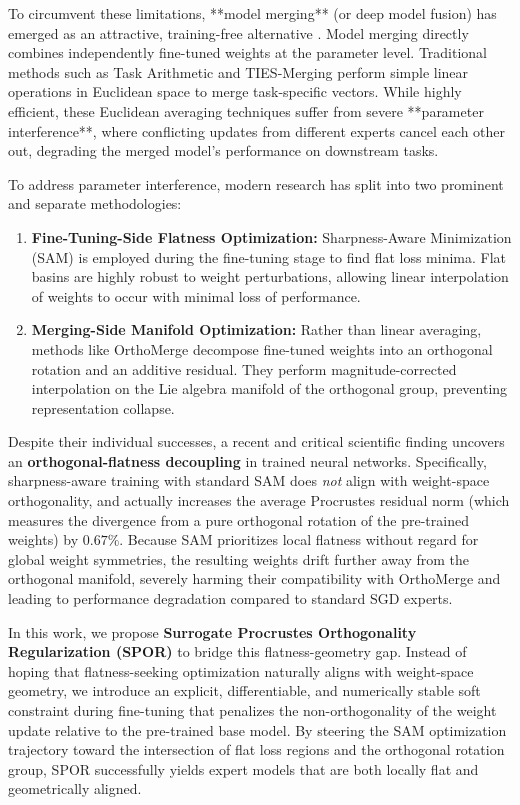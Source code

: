 \documentclass{article}
\theoremstyle{plain}
\theoremstyle{definition}
\theoremstyle{remark}
\begin{document}
To circumvent these limitations, **model merging** (or deep model fusion) has emerged as an attractive, training-free alternative \cite{wortsman2022model, ilharco2022editing}. Model merging directly combines independently fine-tuned weights at the parameter level. Traditional methods such as Task Arithmetic \cite{ilharco2022editing} and TIES-Merging \cite{yadav2023ties} perform simple linear operations in Euclidean space to merge task-specific vectors. While highly efficient, these Euclidean averaging techniques suffer from severe **parameter interference**, where conflicting updates from different experts cancel each other out, degrading the merged model's performance on downstream tasks.

To address parameter interference, modern research has split into two prominent and separate methodologies:
\begin{enumerate}
    \item \textbf{Fine-Tuning-Side Flatness Optimization:} Sharpness-Aware Minimization (SAM) \cite{foret2021sharpness} is employed during the fine-tuning stage to find flat loss minima. Flat basins are highly robust to weight perturbations, allowing linear interpolation of weights to occur with minimal loss of performance.
    \item \textbf{Merging-Side Manifold Optimization:} Rather than linear averaging, methods like OrthoMerge \cite{yang2026orthogonal} decompose fine-tuned weights into an orthogonal rotation and an additive residual. They perform magnitude-corrected interpolation on the Lie algebra manifold of the orthogonal group, preventing representation collapse.
\end{enumerate}

Despite their individual successes, a recent and critical scientific finding uncovers an \textbf{orthogonal-flatness decoupling} in trained neural networks. Specifically, sharpness-aware training with standard SAM does \textit{not} align with weight-space orthogonality, and actually increases the average Procrustes residual norm (which measures the divergence from a pure orthogonal rotation of the pre-trained weights) by $0.67\%$. Because SAM prioritizes local flatness without regard for global weight symmetries, the resulting weights drift further away from the orthogonal manifold, severely harming their compatibility with OrthoMerge and leading to performance degradation compared to standard SGD experts.

In this work, we propose \textbf{Surrogate Procrustes Orthogonality Regularization (SPOR)} to bridge this flatness-geometry gap. Instead of hoping that flatness-seeking optimization naturally aligns with weight-space geometry, we introduce an explicit, differentiable, and numerically stable soft constraint during fine-tuning that penalizes the non-orthogonality of the weight update relative to the pre-trained base model. By steering the SAM optimization trajectory toward the intersection of flat loss regions and the orthogonal rotation group, SPOR successfully yields expert models that are both locally flat and geometrically aligned.
\end{document}
